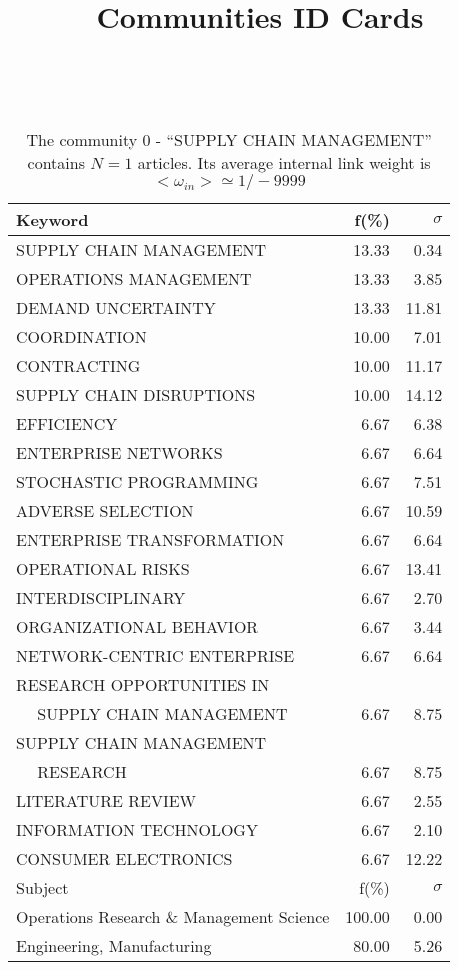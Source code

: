 \documentclass[a4paper,11pt]{report}
\title{{\bf Communities ID Cards}}
\date{\begin{flushleft}This document gather the ``ID Cards'' of the CC communities found within your database.\\
 The CC network was built by keeping a link between articles sharing at least 10 references. The communities characterized here correspond to the ones found in the level 0 (in the sense of the Louvain algo) which gathers more than 0 articles.\\
 These ID cards displays the most frequent keywords, subject categories, journals of publication, institution, countries, authors, references and reference journals of the articles of each community. The significance of an item $\sigma = \sqrt{N} (f - p) / \sqrt{p(1-p)}$ [where $N$ is the number of articles within the community and $f$ and $p$ are the proportion of articles respectively within the community and within the database displaying that item ] is also given (for example $\sigma > 5$ is really highly significant).\\
\vspace{1cm}
\copyright Sebastian Grauwin, Liu Weizhi - (2014) \end{flushleft}}
\begin{document}
\begin{landscape}
\maketitle
\clearpage

\begin{table}[!ht]
\caption{The community 0 - ``SUPPLY CHAIN MANAGEMENT'' contains $N = 1$ articles. Its average internal link weight is $<\omega_{in}> \simeq 1/-9999$ }
\textcolor{white}{aa}\\
{\scriptsize\begin{tabular}{|l r r|}
\hline
Keyword & f(\%) & $\sigma$\\
\hline
SUPPLY CHAIN MANAGEMENT & 13.33 & 0.34\\
OPERATIONS MANAGEMENT & 13.33 & 3.85\\
DEMAND UNCERTAINTY & 13.33 & 11.81\\
COORDINATION & 10.00 & 7.01\\
CONTRACTING & 10.00 & 11.17\\
SUPPLY CHAIN DISRUPTIONS & 10.00 & 14.12\\
EFFICIENCY & 6.67 & 6.38\\
ENTERPRISE NETWORKS & 6.67 & 6.64\\
STOCHASTIC PROGRAMMING & 6.67 & 7.51\\
ADVERSE SELECTION & 6.67 & 10.59\\
ENTERPRISE TRANSFORMATION & 6.67 & 6.64\\
OPERATIONAL RISKS & 6.67 & 13.41\\
INTERDISCIPLINARY & 6.67 & 2.70\\
ORGANIZATIONAL BEHAVIOR & 6.67 & 3.44\\
NETWORK-CENTRIC ENTERPRISE & 6.67 & 6.64\\
RESEARCH OPPORTUNITIES IN &  & \\
$\quad$ SUPPLY CHAIN MANAGEMENT & 6.67 & 8.75\\
SUPPLY CHAIN MANAGEMENT &  & \\
$\quad$ RESEARCH & 6.67 & 8.75\\
LITERATURE REVIEW & 6.67 & 2.55\\
INFORMATION TECHNOLOGY & 6.67 & 2.10\\
CONSUMER ELECTRONICS & 6.67 & 12.22\\
\hline
\hline
Subject & f(\%) & $\sigma$\\
\hline
Operations Research \& Management Science & 100.00 & 0.00\\
Engineering, Manufacturing & 80.00 & 5.26\\

\end{tabular}}
\end{table}
\end{landscape}
\end{document}
